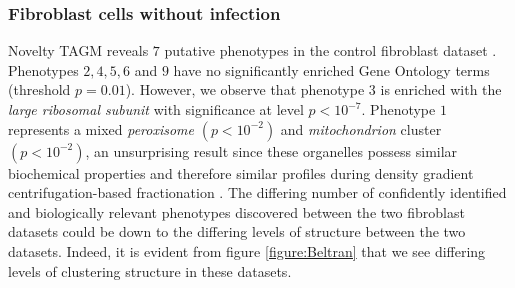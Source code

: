 \documentclass[12pt,english]{article}
\begin{document}
\subsubsection{Fibroblast cells without infection} 
Novelty TAGM reveals $7$ putative phenotypes in the control fibroblast dataset \citep{Jean_Beltran:2016}. Phenotypes $2,4,5,6$ and $9$ have no significantly enriched Gene Ontology terms (threshold $p = 0.01$). However, we observe that phenotype $3$ is enriched with the \textit{large ribosomal subunit} with significance at level $p < 10^{-7} $. Phenotype $1$ represents a mixed \textit{peroxisome} $(p < 10^{-2})$ and \textit{mitochondrion} cluster $(p < 10 ^{-2})$, an unsurprising result since these organelles possess similar biochemical properties and therefore similar profiles during density gradient centrifugation-based fractionation \citep{DC:2018, Dealtry:1992}. The differing number of confidently identified and biologically relevant phenotypes discovered between the two fibroblast datasets could be down to the differing levels of structure between the two datasets. Indeed, it is evident from figure \ref{figure:Beltran} that we see differing levels of clustering structure in these datasets.
\end{document}
